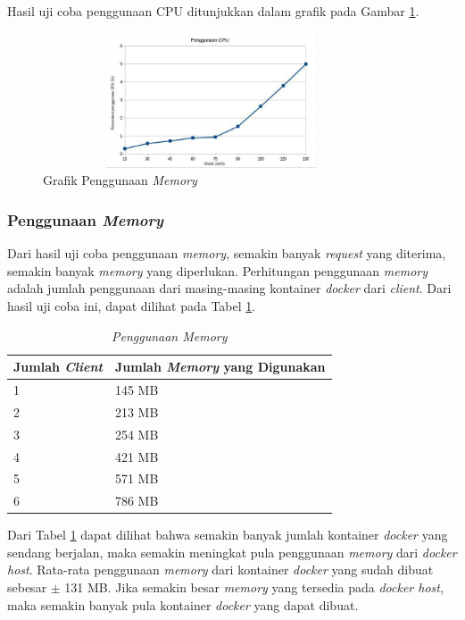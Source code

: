 Hasil uji coba penggunaan CPU ditunjukkan dalam grafik pada Gambar \ref{ram2}.
\begin{figure}[H]
	\centering
	\includegraphics[width=10cm,height=4cm]{images/bab5/penggunaancpu}
	\caption{Grafik Penggunaan \textit{Memory}}
	\label{ram2}
\end{figure}

\subsubsection{Penggunaan \textit{Memory}}
Dari hasil uji coba penggunaan \textit{memory}, semakin banyak \textit{request} yang diterima, semakin banyak \textit{memory} yang diperlukan. Perhitungan penggunaan \textit{memory} adalah jumlah penggunaan dari masing-masing kontainer \textit{docker} dari \textit{client}. Dari hasil uji coba ini, dapat dilihat pada Tabel \ref{penggunaanmemory1}.

\begin{longtable}{|p{}|p{}|}
	\caption{\textit{Penggunaan \textit{Memory}}} \label{penggunaanmemory1} \\
	\hline
	\textbf{Jumlah \textit{Client}} & \textbf{Jumlah \textit{Memory} yang Digunakan} \\ \hline
	\endfirsthead
	
	\endhead
	\endfoot
	\endlastfoot
	
	1 & 145 MB \\ \hline
	2 & 213 MB \\ \hline
	3 & 254 MB \\ \hline
	4 & 421 MB \\ \hline
	5 & 571 MB \\ \hline
	6 & 786 MB \\ \hline
\end{longtable}
Dari Tabel \ref{penggunaanmemory1} dapat dilihat bahwa semakin banyak jumlah kontainer \textit{docker} yang sendang berjalan, maka semakin meningkat pula penggunaan \textit{memory} dari \textit{docker host}. Rata-rata penggunaan \textit{memory} dari kontainer \textit{docker} yang sudah dibuat sebesar $\pm$ 131 MB. Jika semakin besar \textit{memory} yang tersedia pada \textit{docker host}, maka semakin banyak pula kontainer \textit{docker} yang dapat dibuat.

